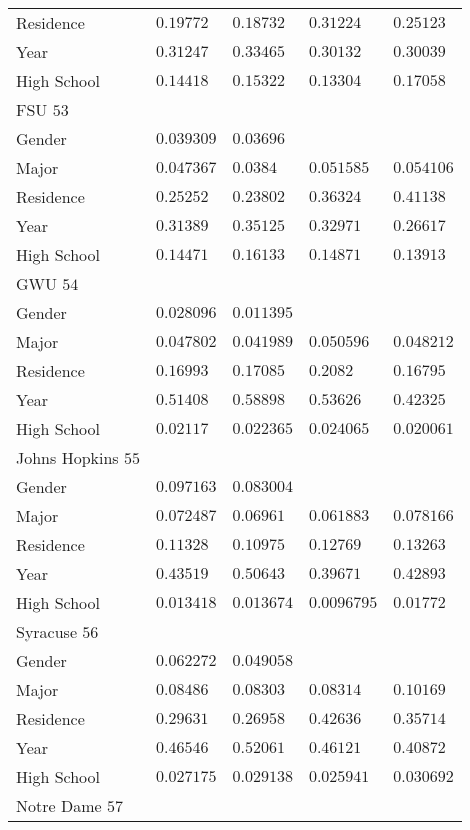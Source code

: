 \begin{center}
\begin{longtable}{|l|l|l|l|l|}
Residence & $0.19772$ & $0.18732$ & $0.31224$ & $0.25123$ \\
Year & $0.31247$ & $0.33465$ & $0.30132$ & $0.30039$ \\
High School & $0.14418$ & $0.15322$ & $0.13304$ & $0.17058$ \\ \hline \hline
FSU $53$ & & &   \\ \hline
Gender & $0.039309$ & $0.03696$ & & \\
Major & $0.047367$ & $0.0384$ & $0.051585$ & $0.054106$ \\
Residence & $0.25252$ & $0.23802$ & $0.36324$ & $0.41138$ \\
Year & $0.31389$ & $0.35125$ & $0.32971$ & $0.26617$ \\
High School & $0.14471$ & $0.16133$ & $0.14871$ & $0.13913$ \\ \hline \hline
GWU $54$ & & &   \\ \hline
Gender & $0.028096$ & $0.011395$ & & \\
Major & $0.047802$ & $0.041989$ & $0.050596$ & $0.048212$ \\
Residence & $0.16993$ & $0.17085$ & $0.2082$ & $0.16795$ \\
Year & $0.51408$ & $0.58898$ & $0.53626$ & $0.42325$ \\
High School & $0.02117$ & $0.022365$ & $0.024065$ & $0.020061$ \\ \hline \hline
Johns Hopkins $55$ & & &   \\ \hline
Gender & $0.097163$ & $0.083004$ & & \\
Major & $0.072487$ & $0.06961$ & $0.061883$ & $0.078166$ \\
Residence & $0.11328$ & $0.10975$ & $0.12769$ & $0.13263$ \\
Year & $0.43519$ & $0.50643$ & $0.39671$ & $0.42893$ \\
High School & $0.013418$ & $0.013674$ & $0.0096795$ & $0.01772$ \\ \hline \hline
Syracuse $56$ & & &   \\ \hline
Gender & $0.062272$ & $0.049058$ & & \\
Major & $0.08486$ & $0.08303$ & $0.08314$ & $0.10169$ \\
Residence & $0.29631$ & $0.26958$ & $0.42636$ & $0.35714$ \\
Year & $0.46546$ & $0.52061$ & $0.46121$ & $0.40872$ \\
High School & $0.027175$ & $0.029138$ & $0.025941$ & $0.030692$ \\ \hline \hline
Notre Dame $57$ & & &   \\ \hline

\end{longtable}
\end{center}
